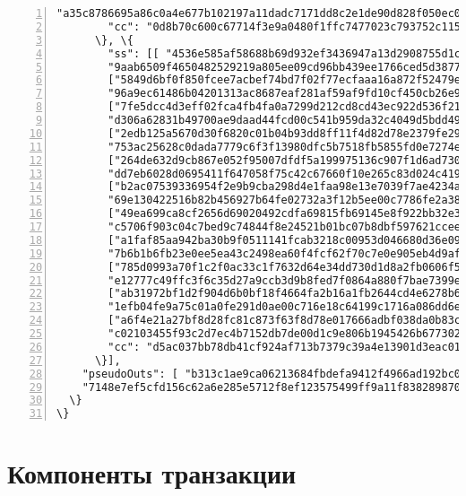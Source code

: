 \begin{appendices}
\begin{Verbatim}[commandchars=\\\{\}, numbers=left]
        "a35c8786695a86c0a4e677b102197a11dadc7171dd8c2e1de90d828f050ec00f"]], 
        "cc": "0d8b70c600c67714f3e9a0480f1ffc7477023c793752c1152d5df0813f75ff0f"
      \}, \{
        "ss": [[ "4536e585af58688b69d932ef3436947a13d2908755d1c644ca9d6a978f0f0206",
        "9aab6509f4650482529219a805ee09cd96bb439ee1766ced5d3877bf1518370b"],
        ["5849d6bf0f850fcee7acbef74bd7f02f77ecfaaa16a872f52479ebd27339760f",
        "96a9ec61486b04201313ac8687eaf281af59af9fd10cf450cb26e9dc8f1ce804"],
        ["7fe5dcc4d3eff02fca4fb4fa0a7299d212cd8cd43ec922d536f21f92c8f93f00",
        "d306a62831b49700ae9daad44fcd00c541b959da32c4049d5bdd49be28d96701"],
        ["2edb125a5670d30f6820c01b04b93dd8ff11f4d82d78e2379fe29d7a68d9c103",
        "753ac25628c0dada7779c6f3f13980dfc5b7518fb5855fd0e7274e3075a3410c"],
        ["264de632d9cb867e052f95007dfdf5a199975136c907f1d6ad73061938f49c01",
        "dd7eb6028d0695411f647058f75c42c67660f10e265c83d024c4199bed073d01"],
        ["b2ac07539336954f2e9b9cba298d4e1faa98e13e7039f7ae4234ac801641340f",
        "69e130422516b82b456927b64fe02732a3f12b5ee00c7786fe2a381325bf3004"],
        ["49ea699ca8cf2656d69020492cdfa69815fb69145e8f922bb32e358c23cebb0f",
        "c5706f903c04c7bed9c74844f8e24521b01bc07b8dbf597621cceeeb3afc1d0c"],
        ["a1faf85aa942ba30b9f0511141fcab3218c00953d046680d36e09c35c04be905",
        "7b6b1b6fb23e0ee5ea43c2498ea60f4fcf62f70c7e0e905eb4d9afa1d0a18800"],
        ["785d0993a70f1c2f0ac33c1f7632d64e34dd730d1d8a2fb0606f5770ed633506",
        "e12777c49ffc3f6c35d27a9ccb3d9b8fed7f0864a880f7bae7399e334207280e"],
        ["ab31972bf1d2f904d6b0bf18f4664fa2b16a1fb2644cd4e6278b63ade87b6d09",
        "1efb04fe9a75c01a0fe291d0ae00c716e18c64199c1716a086dd6e32f63e0a07"],
        ["a6f4e21a27bf8d28fc81c873f63f8d78e017666adbf038da0b83c2ad04ef6805",
        "c02103455f93c2d7ec4b7152db7de00d1c9e806b1945426b6773026b4a85dd03"]], 
        "cc": "d5ac037bb78db41cf924af713b7379c39a4e13901d3eac017238550a1a3b910a"
      \}],
    "pseudoOuts": [ "b313c1ae9ca06213684fbdefa9412f4966ad192bc0b2f74ed1731381adb7ab58",
    "7148e7ef5cfd156c62a6e285e5712f8ef123575499ff9a11f838289870522423"]
  \}
\}
\end{Verbatim}



\section*{Компоненты транзакции}
	

\end{appendices}
